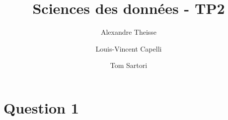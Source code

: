 \documentclass{article}
\title{Sciences des données - TP2}
\author{Alexandre Theisse \and Louis-Vincent Capelli \and Tom Sartori}
\begin{document}
\maketitle
\newpage

\section*{Question 1}
\end{document}
